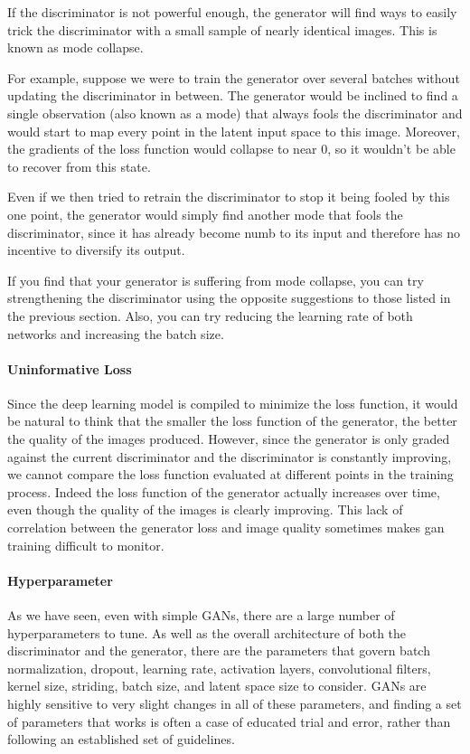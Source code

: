 If the discriminator is not powerful enough, the generator will find ways to easily trick the discriminator with a small sample of nearly identical images.
This is known as mode collapse.

For example, suppose we were to train the generator over several batches without updating the discriminator in between.
The generator would be inclined to find a single observation (also known as a mode) that always fools the discriminator and would start to map every point in the latent input space to this image.
Moreover, the gradients of the loss function would collapse to near 0, so it wouldn’t be able to recover from this state.

Even if we then tried to retrain the discriminator to stop it being fooled by this one point, the generator would simply find another mode that fools the discriminator, since it has already become numb to its input and therefore has no incentive to diversify its output.

If you find that your generator is suffering from mode collapse, you can try strengthening the discriminator using the opposite suggestions to those listed in the previous section.
Also, you can try reducing the learning rate of both networks and increasing the batch size.

\paragraph{Uninformative Loss}

Since the deep learning model is compiled to minimize the loss function, it would be natural to think that the smaller the loss function of the generator, the better the quality of the images produced.
However, since the generator is only graded against the current discriminator and the discriminator is constantly improving, we cannot compare the loss function evaluated at different points in the training process.
Indeed the loss function of the generator actually increases over time, even though the quality of the images is clearly improving.
This lack of correlation between the generator loss and image quality sometimes makes \gls{gan} training difficult to monitor.

\paragraph{Hyperparameter}

As we have seen, even with simple GANs, there are a large number of hyperparameters to tune.
As well as the overall architecture of both the discriminator and the generator, there are the parameters that govern batch normalization, dropout, learning rate, activation layers, convolutional filters, kernel size, striding, batch size, and latent space size to consider.
GANs are highly sensitive to very slight changes in all of these parameters, and finding a set of parameters that works is often a case of educated trial and error, rather than following an established set of guidelines.

